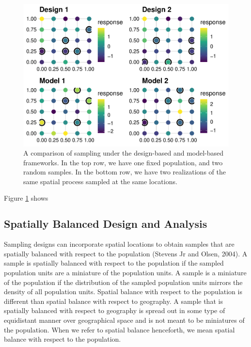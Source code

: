 \documentclass[]{elsarticle} %
\begin{document}
\begin{figure}
\includegraphics[width=1\linewidth]{SpatialDVM_Manuscript_files/figure-latex/fig1-1} \caption{A comparison of sampling under the design-based and model-based frameworks. In the top row, we have one fixed population, and two random samples. In the bottom row, we have two realizations of the same spatial process sampled at the same locations.}\label{fig:fig1}
\end{figure}

Figure \ref{fig:fig1} shows

\hypertarget{spatially-balanced-design-and-analysis}{%
\subsection{Spatially Balanced Design and
Analysis}\label{spatially-balanced-design-and-analysis}}

Sampling designs can incorporate spatial locations to obtain samples
that are spatially balanced with respect to the population (Stevens Jr
and Olsen, 2004). A sample is spatially balanced with respect to the
population if the sampled population units are a miniature of the
population units. A sample is a miniature of the population if the
distribution of the sampled population units mirrors the density of all
population units. Spatial balance with respect to the population is
different than spatial balance with respect to geography. A sample that
is spatially balanced with respect to geography is spread out in some
type of equidistant manner over geographical space and is not meant to
be miniatures of the population. When we refer to spatial balance
henceforth, we mean spatial balance with respect to the population.
\end{document}
